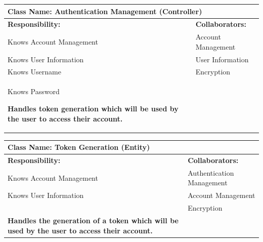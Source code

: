 \documentclass[]{article}
\begin{document}
     	\begin{table}[ht]
		\centering
		\begin{tabular}{|p{7cm}|p{7cm}|}
		\hline 
		\multicolumn{2}{|l|}{\textbf{Class Name:} Authentication Management (Controller)} \\
		\hline
		\textbf{Responsibility:} & \textbf{Collaborators:} \\
		\hline
            Knows Account Management & Account Management\\
            
            Knows User Information & User Information\\
            Knows Username & Encryption\\
            Knows Password\
            
            \vspace{0.1in}
            \textbf{Handles token generation which will be used by the user to access their account.}

		\vspace{1in} & \\
		\hline
  
		\end{tabular}
	\end{table}
 

	\begin{table}[ht]
		\centering
		\begin{tabular}{|p{7cm}|p{7cm}|}
		\hline 
		 \multicolumn{2}{|l|}{\textbf{Class Name:} Token Generation (Entity)} \\
		\hline
		\textbf{Responsibility:} & \textbf{Collaborators:} \\
		\hline
            Knows Account Management & Authentication Management\\
            
            Knows User Information & Account Management\\
            & Encryption\\
            
            \vspace{0.1in}
            \textbf{Handles the generation of a token which will be used by the user to access their account.}

		\vspace{1in} & \\
		\hline
  
		\end{tabular}
	\end{table}
\end{document}
